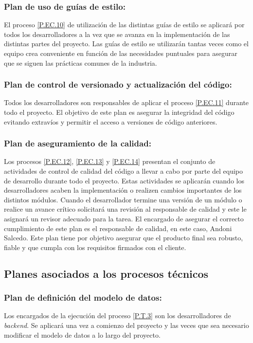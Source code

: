 \documentclass{article}
\begin{document}
\subsubsection{Plan de uso de guías de estilo: } \label{PL.EC.8}
El proceso \ref{P.EC.10} de utilización de las distintas guías de estilo se aplicará por todos los desarrolladores a la vez que se avanza en la implementación de las distintas partes del proyecto. Las guías de estilo se utilizarán tantas veces como el equipo crea conveniente en función de las necesidades puntuales para asegurar que se siguen las prácticas comunes de la industria.

\subsubsection{Plan de control de versionado y actualización del código: } \label{PL.EC.9}

Todos los desarrolladores son responsables de aplicar el proceso \ref{P.EC.11} durante todo el proyecto. El objetivo de este plan es asegurar la integridad del código evitando extravíos y permitir el acceso a versiones de código anteriores.

\subsubsection{Plan de aseguramiento de la calidad:} \label{PL.EC.10}

Los procesos \ref{P.EC.12}, \ref{P.EC.13} y \ref{P.EC.14} presentan el conjunto de actividades de control de calidad del código a llevar a cabo por parte del equipo de desarrollo durante todo el proyecto. Estas actividades se aplicarán cuando los desarrolladores acaben la implementación o realizen cambios importantes de los distintos módulos. Cuando el desarrollador termine una versión de un módulo o realice un avance crítico solicitará una revisión al responsable de calidad y este le asignará un revisor adecuado para la tarea.
El encargado de asegurar el correcto cumplimiento de este plan es el responsable de calidad, en este caso, Andoni Salcedo. Este plan tiene por objetivo asegurar que el producto final sea robusto, fiable y que cumpla con los requisitos firmados con el cliente.

\subsection{Planes asociados a los procesos técnicos}

\subsubsection{Plan de definición del modelo de datos:} \label{PL.T.1}
Los encargados de la ejecución del proceso \ref{P.T.3} son los desarrolladores de \textit{backend}. Se aplicará una vez a comienzo del proyecto y las veces que sea necesario modificar el modelo de datos a lo largo del proyecto.
\end{document}
